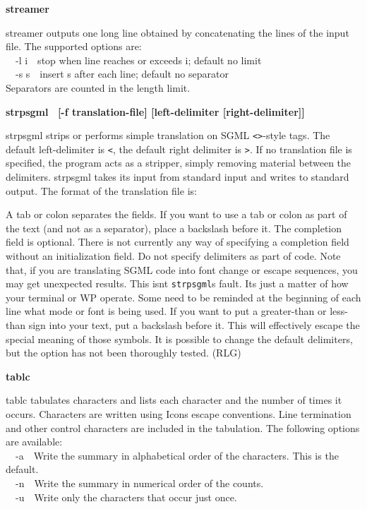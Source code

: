 {{\sffamily\bfseries
streamer\ \ \ \ \ \ \ \ \ \ \ \ \ \ \ \ \ \ \ \ }

\textsf{streamer} outputs one long line obtained by concatenating the
lines of the input file. The supported options are:\\
\ \ \textsf{{}-l i}\ \ stop when line reaches or exceeds i; default no
limit\\
\ \ \textsf{{}-s s}\ \ insert s after each line; default no
separator\\
Separators are counted in the length limit.

{\sffamily\bfseries
strpsgml \ \textrm{\textmd{[-f}}\textmd{
}\textrm{\textmd{translation-file]}}\textmd{
}\textrm{\textmd{[left-delimiter}}\textmd{
}\textrm{\textmd{[right-delimiter]]}}}

\textsf{strpsgml} strips or performs simple translation on
SGML \texttt{{\textless}{\textgreater}}{}-style tags. The
default left-delimiter is \texttt{{\textless}}, the default right
delimiter is \texttt{{\textgreater}}. If no translation file is
specified, the program acts as a stripper, simply removing material
between the delimiters. \textsf{strpsgml} takes its input from standard
input and writes to standard output. The format of the translation file
is:


A tab or colon separates the fields. If you want to use a tab or colon
as part of the text (and not as a separator), place a backslash before
it. The completion field is optional. There is not currently any way of
specifying a completion field without an initialization field. Do not
specify delimiters as part of code. Note that, if you are translating
SGML code into font change or escape sequences, you may get unexpected
results. This isn{\textquotesingle}t
\texttt{strpsgml}{\textquotesingle}s fault. It{\textquotesingle}s just
a matter of how your terminal or WP operate. Some need to be
{\textquotedbl}reminded{\textquotedbl} at the beginning of each line
what mode or font is being used. If you want to put a greater-than or
less-than sign into your text, put a backslash before it. This will
effectively {\textquotedbl}escape{\textquotedbl} the special meaning of
those symbols. It is possible to change the default delimiters, but the
option has not been thoroughly tested. (RLG)

{\sffamily\bfseries
tablc\ \ \ \ \ \ \ \ \ \ \ \ \ \ \ \ \ \ \ \ \ \ }

\textsf{tablc} tabulates characters and lists each character and the
number of times it occurs. Characters are written using
Icon{\textquotesingle}s escape conventions. Line termination and other
control characters are included in the tabulation. The following
options are available:\\
\ \ \textsf{{}-a}\ \ Write the summary in alphabetical order of the
characters. This is the default.\\
\ \ \textsf{{}-n}\ \ Write the summary in numerical order of the
counts.\\
\ \ \textsf{{}-u}\ \ Write only the characters that occur just once.

}
